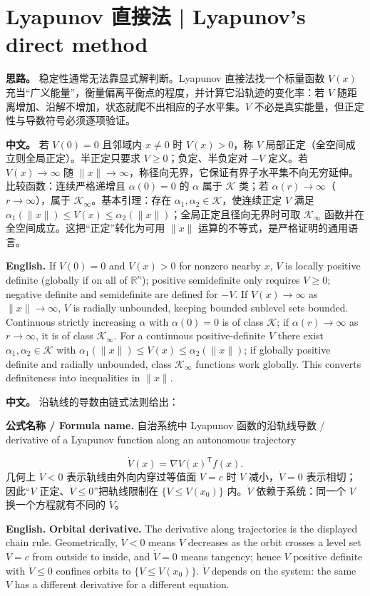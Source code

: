 \documentclass[UTF8,11pt,a4paper]{ctexart}
\newcommand{\FORMULA}[2]{\par\noindent\textbf{公式名称 / Formula name.} #1 / #2\par}
\newcommand{\APS}[2]{\par\noindent\textbf{中文。} #1\par\noindent\textbf{English.} #2\par}
\newcommand{\R}{\mathbb{R}}\newcommand{\N}{\mathbb{N}}
\newcommand{\norm}[1]{\lVert #1\rVert}\newcommand{\abs}[1]{\lvert #1\rvert}
\begin{document}
\section{Lyapunov 直接法 | Lyapunov's direct method}
\noindent\textbf{思路。} 稳定性通常无法靠显式解判断。Lyapunov 直接法找一个标量函数 $V(x)$ 充当“广义能量”，衡量偏离平衡点的程度，并计算它沿轨迹的变化率：若 $V$ 随距离增加、沿解不增加，状态就爬不出相应的子水平集。$V$ 不必是真实能量，但正定性与导数符号必须逐项验证。\par{}

\APS{若 $V(0)=0$ 且邻域内 $x\ne0$ 时 $V(x)>0$，称 $V$ 局部正定（全空间成立则全局正定）。半正定只要求 $V\ge0$；负定、半负定对 $-V$ 定义。若 $V(x)\to\infty$ 随 $\norm{x}\to\infty$，称径向无界，它保证有界子水平集不向无穷延伸。比较函数：连续严格递增且 $\alpha(0)=0$ 的 $\alpha$ 属于 $\mathcal K$ 类；若 $\alpha(r)\to\infty$（$r\to\infty$），属于 $\mathcal K_\infty$。基本引理：存在 $\alpha_1,\alpha_2\in\mathcal K$，使连续正定 $V$ 满足 $\alpha_1(\norm{x})\le V(x)\le\alpha_2(\norm{x})$；全局正定且径向无界时可取 $\mathcal K_\infty$ 函数并在全空间成立。这把“正定”转化为可用 $\norm{x}$ 运算的不等式，是严格证明的通用语言。}{If $V(0)=0$ and $V(x)>0$ for nonzero nearby $x$, $V$ is locally positive definite (globally if on all of $\R^n$); positive semidefinite only requires $V\ge0$; negative definite and semidefinite are defined for $-V$. If $V(x)\to\infty$ as $\norm{x}\to\infty$, $V$ is radially unbounded, keeping bounded sublevel sets bounded. Continuous strictly increasing $\alpha$ with $\alpha(0)=0$ is of class $\mathcal K$; if $\alpha(r)\to\infty$ as $r\to\infty$, it is of class $\mathcal K_\infty$. For a continuous positive-definite $V$ there exist $\alpha_1,\alpha_2\in\mathcal K$ with $\alpha_1(\norm{x})\le V(x)\le\alpha_2(\norm{x})$; if globally positive definite and radially unbounded, class $\mathcal K_\infty$ functions work globally. This converts definiteness into inequalities in $\norm{x}$.}

\APS{沿轨线的导数由链式法则给出：
\FORMULA{自治系统中 Lyapunov 函数的沿轨线导数}{derivative of a Lyapunov function along an autonomous trajectory}
\[
\dot V(x)=\nabla V(x)^{\mathsf T}f(x).
\]
几何上 $\dot V<0$ 表示轨线由外向内穿过等值面 $V=c$ 时 $V$ 减小，$\dot V=0$ 表示相切；因此“$V$ 正定、$\dot V\le0$”把轨线限制在 $\{V\le V(x_0)\}$ 内。$\dot V$ 依赖于系统：同一个 $V$ 换一个方程就有不同的 $\dot V$。}{\textbf{Orbital derivative.} The derivative along trajectories is the displayed chain rule. Geometrically, $\dot V<0$ means $V$ decreases as the orbit crosses a level set $V=c$ from outside to inside, and $\dot V=0$ means tangency; hence $V$ positive definite with $\dot V\le0$ confines orbits to $\{V\le V(x_0)\}$. $\dot V$ depends on the system: the same $V$ has a different derivative for a different equation.}
\end{document}
